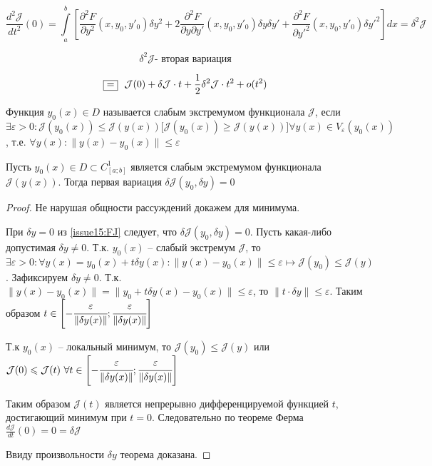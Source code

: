 \begin{equation} \label{issue15:SJ}
	\frac{d^2 \mathcal{J}}{dt^2}(0) = \int \limits_a^b \left[  \frac{\partial^2 F}{\partial y^2}(x, y_0, y'_0) \delta y^2 
	+ 2\frac{\partial^2 F}{\partial y \partial {y'}} (x, y_0, y'_0) \delta y \delta {y'} + \frac{\partial^2 F}{\partial {y'}^2} (x, y_0, y'_0) \delta {y'}^2  \right] dx 
	= \delta^2 \mathcal{J}
\end{equation}

\[ \delta^2 \mathcal{J} \text{- вторая вариация} \]

\[ \fbox{=}~~ \mathcal{J}(0) + \delta \mathcal{J}\cdot t + \frac{1}{2} \delta^2 \mathcal{J} \cdot t^2 + o(t^2)\]

\begin{definition}
	Функция $y_0(x) \in D$ называется слабым экстремумом функционала $\mathcal{J}$, если $\exists \varepsilon > 0: \mathcal{J}(y_0(x)) \leqslant \mathcal{J}(y(x)) \big[ \mathcal{J}(y_0(x)) \geqslant \mathcal{J}(y(x)) \big] \forall y(x) \in V_{\varepsilon} (y_0(x))$, т.е. $\forall y(x): \| y(x) - y_0(x)\| \leqslant \varepsilon$ 
\end{definition}

\begin{theorem}
	Пусть $y_0(x) \in D \subset C^1_{[a;b]}$ является слабым экстремумом функционала $\mathcal{J}(y(x))$. Тогда первая вариация $\delta \mathcal{J}(y_0, \delta y) = 0$ 
\end{theorem}
\begin{proof}
	Не нарушая общности рассуждений докажем для минимума.
	
	При $\delta y = 0$ из \eqref{issue15:FJ} следует, что $\delta \mathcal{J}(y_0, \delta y) = 0$. Пусть какая-либо допустимая $\delta y \neq 0$. Т.к. $y_0(x)$ -- слабый экстремум $\mathcal{J}$, то $\exists \varepsilon > 0: \forall y(x) = y_0(x) + t \delta y(x): \| y(x) - y_0(x) \| \leqslant \varepsilon \mapsto \mathcal{J}(y_0) \leqslant \mathcal{J}(y)$. 
	Зафиксируем $\delta y \neq 0$. Т.к. $\| y(x) - y_0(x) \| = \| y_0 + t \delta y(x) - y_0(x)\| \leqslant \varepsilon$, то $\| t \cdot \delta y \| \leqslant \varepsilon $. Таким образом $t \in \left[ - \cfrac{\varepsilon}{\| \delta y(x)\|}; \cfrac{\varepsilon}{\| \delta y(x)\|}\right]$  
	
	Т.к $y_0(x)$ -- локальный минимум, то $\mathcal{J}(y_0) \leqslant \mathcal{J}(y)$ или $\mathcal{J}(0) \leqslant \mathcal{J}(t)~\forall t \in \left[ - \cfrac{\varepsilon}{\| \delta y(x)\|}; \cfrac{\varepsilon}{\| \delta y(x)\|} \right]$ 
	
	Таким образом $\mathcal{J}(t)$ является непрерывно дифференцируемой функцией $t$, достигающий минимум при $t = 0$. Следовательно по теореме Ферма $\frac{d \mathcal{J}}{dt} (0) = 0 = \delta \mathcal{J}$
	
	Ввиду произвольности $\delta y$ теорема доказана. 
\end{proof}

